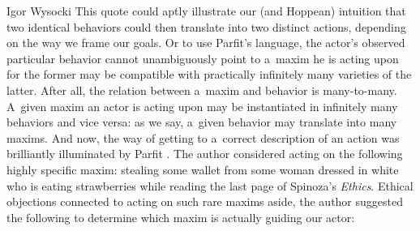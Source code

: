 \begin{artengenv}{Igor Wysocki}
This quote could aptly illustrate our (and Hoppean) intuition that two identical behaviors could then translate into two distinct actions, depending on the way we frame our goals. Or to use Parfit's language, the actor's observed particular behavior cannot unambiguously point to a~maxim he is acting upon for the former may be compatible with practically infinitely many varieties of the latter. After all, the relation between a~maxim and behavior is many-to-many. A~given maxim an actor is acting upon may be instantiated in infinitely many behaviors and vice versa: as we say, a~given behavior may translate into many maxims. And now, the way of getting to a~correct description of an action was brilliantly illuminated by Parfit
\parencite*[][pp.289–290]{parfit_what_2011}. %
 The author considered acting on the following highly specific maxim: stealing some wallet from some woman dressed in white who is eating strawberries while reading the last page of Spinoza's \textit{Ethics}. Ethical objections connected to acting on such rare maxims aside, the author suggested the following to determine which maxim is actually guiding our actor:


\end{artengenv}
